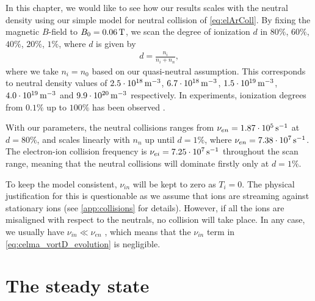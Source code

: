 In this chapter, we would like to see how our results scales with the neutral density using our simple model for neutral collision of \cref{eq:elArColl}.
By fixing the magnetic $B$-field to $B_0=0.06\, \text{T}$, we scan the degree of ionization $d$ in $80\%$, $60\%$, $40\%$, $20\%$, $1\%$, where $d$ is given by
%
\begin{align*}
    d = \frac{n_i}{n_i+n_n},
\end{align*}
%
where we take $n_i=n_0$ based on our quasi-neutral assumption.
This corresponds to neutral density values of
$2.5\cdot10^{18}\, \text{m}^{-3}$,
$6.7\cdot10^{18}\, \text{m}^{-3}$,
$1.5\cdot10^{19}\, \text{m}^{-3}$,
$4.0\cdot10^{19}\, \text{m}^{-3}$ and
$9.9\cdot10^{20}\, \text{m}^{-3}$
respectively.
In experiments, ionization degrees from $0.1\%$ up to $100\%$ has been observed \cite{Schroder2003Phd}.

With our parameters, the neutral collisions ranges from $\nu_{en}=1.87\cdot10^{5}\, \text{s}^{-1}$ at $d=80\%$, and scales linearly with $n_n$ up until $d=1\%$, where $\nu_{en}=7.38\cdot10^7\, \text{s}^{-1}$.
The electron-ion collision frequency is $\nu_{ei}=7.25\cdot10^7 \, \text{s}^{-1}$ throughout the scan range, meaning that the neutral collisions will dominate firstly only at $d=1\%$.

To keep the model consistent, $\nu_{in}$ will be kept to zero as $T_i=0$.
The physical justification for this is questionable as we assume that ions are streaming against stationary ions (see \cref{app:collisions} for details).
However, if all the ions are misaligned with respect to the neutrals, no collision will take place.
In any case, we usually have $\nu_{in}\ll\nu_{en}$ \cite{Schroder2003Phd}, which means that the $\nu_{in}$ term in \cref{eq:celma_vortD_evolution} is negligible.

\section{The steady state}

